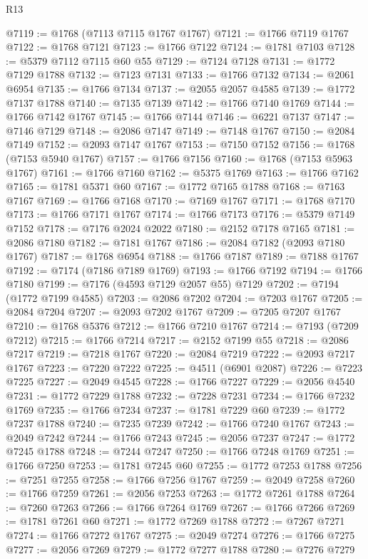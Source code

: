 \begin{lexlean}{R13}
\begin{coremodule}
@7119 := @1768 (@7113 @7115 @1767 @1767)
@7121 := @1766 @7119 @1767
@7122 := @1768 @7121
@7123 := @1766 @7122
@7124 := @1781 @7103
@7128 := @5379 @7112 @7115 @60 @55
@7129 := @7124 @7128
@7131 := @1772 @7129 @1788
@7132 := @7123 @7131
@7133 := @1766 @7132
@7134 := @2061 @6954
@7135 := @1766 @7134
@7137 := @2055 @2057 @4585
@7139 := @1772 @7137 @1788
@7140 := @7135 @7139
@7142 := @1766 @7140 @1769
@7144 := @1766 @7142 @1767
@7145 := @1766 @7144
@7146 := @6221 @7137
@7147 := @7146 @7129
@7148 := @2086 @7147
@7149 := @7148 @1767
@7150 := @2084 @7149
@7152 := @2093 @7147 @1767
@7153 := @7150 @7152
@7156 := @1768 (@7153 @5940 @1767)
@7157 := @1766 @7156
@7160 := @1768 (@7153 @5963 @1767)
@7161 := @1766 @7160
@7162 := @5375 @1769
@7163 := @1766 @7162
@7165 := @1781 @5371 @60
@7167 := @1772 @7165 @1788
@7168 := @7163 @7167
@7169 := @1766 @7168
@7170 := @7169 @1767
@7171 := @1768 @7170
@7173 := @1766 @7171 @1767
@7174 := @1766 @7173
@7176 := @5379 @7149 @7152
@7178 := @7176 @2024 @2022
@7180 := @2152 @7178 @7165
@7181 := @2086 @7180
@7182 := @7181 @1767
@7186 := @2084 @7182 (@2093 @7180 @1767)
@7187 := @1768 @6954
@7188 := @1766 @7187
@7189 := @7188 @1767
@7192 := @7174 (@7186 @7189 @1769)
@7193 := @1766 @7192
@7194 := @1766 @7180
@7199 := @7176 (@4593 @7129 @2057 @55) @7129
@7202 := @7194 (@1772 @7199 @4585)
@7203 := @2086 @7202
@7204 := @7203 @1767
@7205 := @2084 @7204
@7207 := @2093 @7202 @1767
@7209 := @7205 @7207 @1767
@7210 := @1768 @5376
@7212 := @1766 @7210 @1767
@7214 := @7193 (@7209 @7212)
@7215 := @1766 @7214
@7217 := @2152 @7199 @55
@7218 := @2086 @7217
@7219 := @7218 @1767
@7220 := @2084 @7219
@7222 := @2093 @7217 @1767
@7223 := @7220 @7222
@7225 := @4511 (@6901 @2087)
@7226 := @7223 @7225
@7227 := @2049 @4545
@7228 := @1766 @7227
@7229 := @2056 @4540
@7231 := @1772 @7229 @1788
@7232 := @7228 @7231
@7234 := @1766 @7232 @1769
@7235 := @1766 @7234
@7237 := @1781 @7229 @60
@7239 := @1772 @7237 @1788
@7240 := @7235 @7239
@7242 := @1766 @7240 @1767
@7243 := @2049 @7242
@7244 := @1766 @7243
@7245 := @2056 @7237
@7247 := @1772 @7245 @1788
@7248 := @7244 @7247
@7250 := @1766 @7248 @1769
@7251 := @1766 @7250
@7253 := @1781 @7245 @60
@7255 := @1772 @7253 @1788
@7256 := @7251 @7255
@7258 := @1766 @7256 @1767
@7259 := @2049 @7258
@7260 := @1766 @7259
@7261 := @2056 @7253
@7263 := @1772 @7261 @1788
@7264 := @7260 @7263
@7266 := @1766 @7264 @1769
@7267 := @1766 @7266
@7269 := @1781 @7261 @60
@7271 := @1772 @7269 @1788
@7272 := @7267 @7271
@7274 := @1766 @7272 @1767
@7275 := @2049 @7274
@7276 := @1766 @7275
@7277 := @2056 @7269
@7279 := @1772 @7277 @1788
@7280 := @7276 @7279

\end{coremodule}
\end{lexlean}

